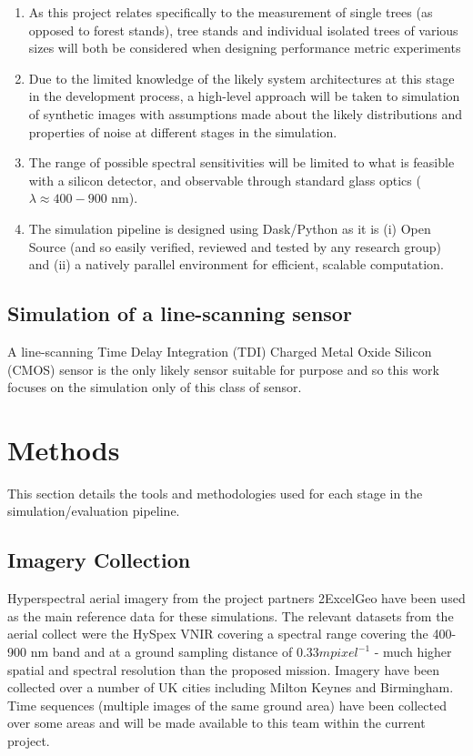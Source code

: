 \documentclass[10pt,a4paper,final,onecolumn]{article}
\begin{document}
\begin{enumerate}
\item As this project relates specifically to the measurement of single trees (as opposed to forest stands), tree stands and individual isolated trees of various sizes will both be considered when designing performance metric experiments
\item Due to the limited knowledge of the likely system architectures at this stage in the development process, a high-level approach will be taken to simulation of synthetic images with assumptions made about the likely distributions and properties of noise at different stages in the simulation.
\item The range of possible spectral sensitivities will be limited to what is feasible with a silicon detector, and observable through standard glass optics ($\lambda \approx 400 - 900$ nm).
\item The simulation pipeline is designed using Dask/Python as it is (i) Open Source (and so easily verified, reviewed and tested by any research group) and (ii) a natively parallel environment for efficient, scalable computation.
\end{enumerate}
 
\subsection{Simulation of a line-scanning sensor}
A line-scanning Time Delay Integration (TDI) Charged Metal Oxide Silicon (CMOS) sensor is the only likely sensor suitable for purpose and so this work focuses on the simulation only of this class of sensor.

\section{Methods}
This section details the tools and methodologies used for each stage in the simulation/evaluation pipeline.
\subsection{Imagery Collection}
Hyperspectral aerial imagery from the project partners 2ExcelGeo have been used as the main reference data for these simulations. The relevant datasets from the aerial collect were the HySpex VNIR covering a spectral range covering the 400-900 nm band and at a ground sampling distance of $0.33 m pixel^{-1}$ - much higher spatial and spectral resolution than the proposed mission. Imagery have been collected over a number of UK cities including Milton Keynes and Birmingham. Time sequences (multiple images of the same ground area) have been collected over some areas and will be made available to this team within the current project.
\end{document}
